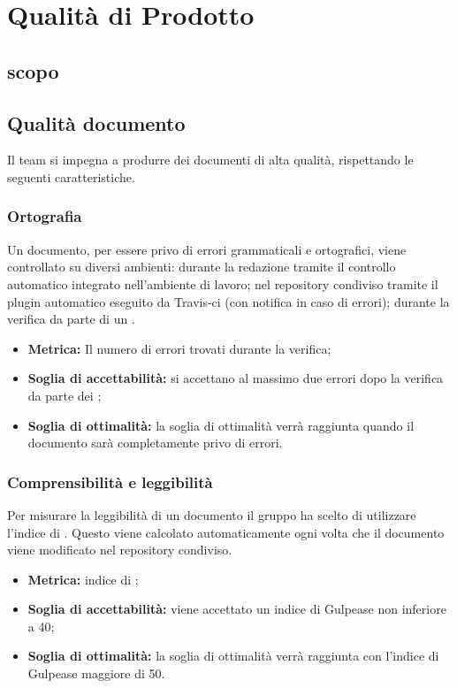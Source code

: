 \chapter{Qualità di Prodotto}
\label{prodotto}
\section{scopo}

\section{Qualità documento}
\label{documento}
Il team si impegna a produrre dei documenti di alta qualità, rispettando le seguenti caratteristiche.
\subsection{Ortografia}
Un documento, per essere privo di errori grammaticali e ortografici, viene controllato su diversi ambienti: durante la redazione tramite il controllo automatico integrato nell'ambiente di lavoro; nel repository condiviso tramite il plugin automatico eseguito da Travis-ci (con notifica in caso di errori); durante la verifica da parte di un .
\begin{itemize}
    \item \textbf{Metrica:} Il numero di errori trovati durante la verifica;
    \item \textbf{Soglia di accettabilità:} si accettano al massimo due errori dopo la verifica da parte dei ;
    \item \textbf{Soglia di ottimalità:} la soglia di ottimalità verrà raggiunta quando il documento sarà completamente privo di errori.
\end{itemize}
\subsection{Comprensibilità e leggibilità}
Per misurare la leggibilità di un documento il gruppo ha scelto di utilizzare l'indice di . Questo viene calcolato automaticamente ogni volta che il documento viene modificato nel repository condiviso.
\begin{itemize}
    \item \textbf{Metrica:} indice di ;
    \item \textbf{Soglia di accettabilità:} viene accettato un indice di Gulpease non inferiore a 40;
    \item \textbf{Soglia di ottimalità:} la soglia di ottimalità verrà raggiunta con l'indice di Gulpease maggiore di 50.
\end{itemize}
